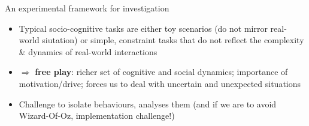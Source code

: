 \documentclass[handout,compress]{beamer}
\begin{document}







\begin{frame}{An experimental framework for investigation}

    \begin{itemize}
        \item<1-> Typical socio-cognitive tasks are either toy scenarios (\ie do not mirror
            real-world siutation) or simple, constraint tasks that do not
            reflect the complexity \& dynamics of real-world interactions
        \item<2-> $\Rightarrow$ {\bf free play}: richer set of cognitive and
            social dynamics; importance of motivation/drive; forces us to deal
            with uncertain and unexpected situations
        \item<3-> Challenge to isolate behaviours, analyses them (and if we are
            to avoid Wizard-Of-Oz, implementation challenge!)
    \end{itemize}
\end{frame}



\end{document}
